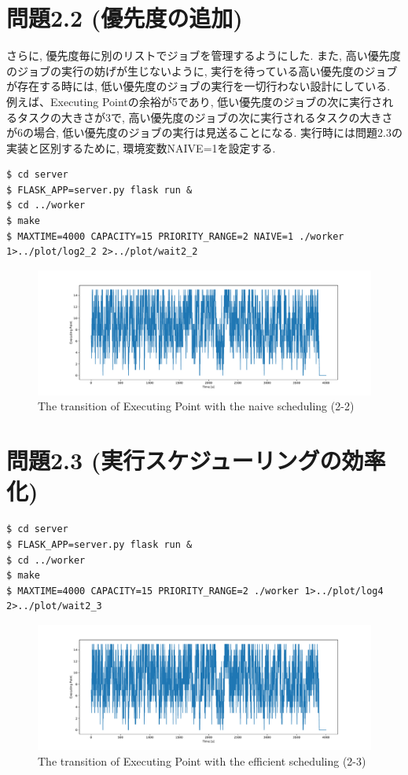 \section*{問題2.2 (優先度の追加)}

さらに, 優先度毎に別のリストでジョブを管理するようにした.
また, 高い優先度のジョブの実行の妨げが生じないように, 実行を待っている高い優先度のジョブが存在する時には, 低い優先度のジョブの実行を一切行わない設計にしている.
例えば、Executing Pointの余裕が5であり, 低い優先度のジョブの次に実行されるタスクの大きさが3で, 高い優先度のジョブの次に実行されるタスクの大きさが6の場合, 低い優先度のジョブの実行は見送ることになる.
実行時には問題2.3の実装と区別するために, 環境変数NAIVE=1を設定する.

\begin{lstlisting}[]
$ cd server
$ FLASK_APP=server.py flask run &
$ cd ../worker
$ make
$ MAXTIME=4000 CAPACITY=15 PRIORITY_RANGE=2 NAIVE=1 ./worker 1>../plot/log2_2 2>../plot/wait2_2
\end{lstlisting}

\begin{figure}[htbp]
  \centering
  \includegraphics[width=\linewidth]{imgs/log2_2.pdf}
  \caption{The transition of Executing Point with the naive scheduling (2-2)}
  \label{fig:log2_2}
\end{figure}

\clearpage
\section*{問題2.3 (実行スケジューリングの効率化)}

\begin{lstlisting}[]
$ cd server
$ FLASK_APP=server.py flask run &
$ cd ../worker
$ make
$ MAXTIME=4000 CAPACITY=15 PRIORITY_RANGE=2 ./worker 1>../plot/log4 2>../plot/wait2_3
\end{lstlisting}

\begin{figure}[htbp]
  \centering
  \includegraphics[width=\linewidth]{imgs/log2_3.pdf}
  \caption{The transition of Executing Point with the efficient scheduling (2-3)}
  \label{fig:log2_3}
\end{figure}

